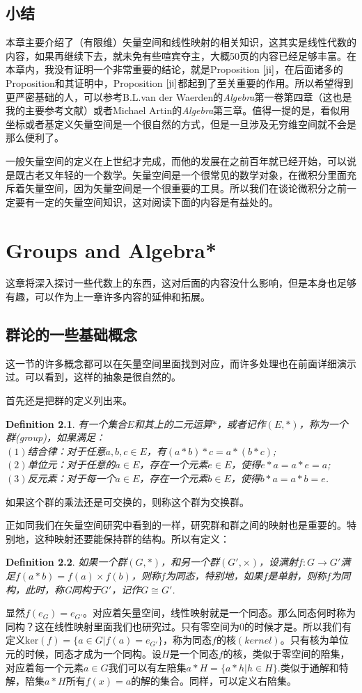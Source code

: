 \documentclass[11pt,a4paper,openany]{book}%
\theoremstyle{plain}%
\newtheorem{defi}{Definition}[chapter]%
\newcommand{\NO}[1]{{$(#1)$}}%
\newcommand{\pref}[1]{{\rm Proposition} $\ref{#1}$}
\begin{document}
\section{小结}
本章主要介绍了（有限维）矢量空间和线性映射的相关知识，这其实是线性代数的内容，如果再继续下去，就未免有些喧宾夺主，大概50页的内容已经足够丰富。在本章内，我没有证明一个非常重要的结论，就是\pref{ji}，在后面诸多的Proposition和其证明中，\pref{ji}都起到了至关重要的作用。所以希望得到更严密基础的人，可以参考B.L.van der Waerden的\textit{Algebra}第一卷第四章（这也是我的主要参考文献）或者Michael Artin的\textit{Algebra}第三章。值得一提的是，看似用坐标或者基定义矢量空间是一个很自然的方式，但是一旦涉及无穷维空间就不会是那么便利了。

一般矢量空间的定义在上世纪才完成，而他的发展在之前百年就已经开始，可以说是既古老又年轻的一个数学。矢量空间是一个很常见的数学对象，在微积分里面充斥着矢量空间，因为矢量空间是一个很重要的工具。所以我们在谈论微积分之前一定要有一定的矢量空间知识，这对阅读下面的内容是有益处的。
\chapter{Groups and Algebra*}
这章将深入探讨一些代数上的东西，这对后面的内容没什么影响，但是本身也足够有趣，可以作为上一章许多内容的延伸和拓展。
\section{群论的一些基础概念}
这一节的许多概念都可以在矢量空间里面找到对应，而许多处理也在前面详细演示过。可以看到，这样的抽象是很自然的。

首先还是把群的定义列出来。
\begin{defi}有一个集合$E$和其上的二元运算$*$，或者记作$(E,*)$，称为一个群\rm{(group)}，如果满足：\\
\NO{1}结合律：对于任意$a,b,c\in E$，有$(a*b)*c=a*(b*c)$;\\
\NO{2}单位元：对于任意的$a\in E$，存在一个元素$e\in E$，使得$e*a=a*e=a$;\\
\NO{3}反元素：对于每一个$a\in E$，存在一个元素$b\in E$，使得$b*a=a*b=e$.
\end{defi}
如果这个群的乘法还是可交换的，则称这个群为交换群。

正如同我们在矢量空间研究中看到的一样，研究群和群之间的映射也是重要的。特别地，这种映射还要能保持群的结构。所以有定义：
\begin{defi}如果一个群$(G,*)$，和另一个群$(G',\times)$，设满射$f:G\rightarrow G'$满足$f(a*b)=f(a)\times f(b)$，则称$f$为同态，特别地，如果$f$是单射，则称$f$为同构，此时，称G同构于$G'$，记作$G \cong G'$.
\end{defi}
显然$f(e_G)=e_{G'}$。对应着矢量空间，线性映射就是一个同态。那么同态何时称为同构？这在线性映射里面我们也研究过。只有零空间为0的时候才是。所以我们有定义$\mathrm{ker}(f)=\{a\in G|f(a)=e_{G'}\}$，称为同态$f$的核$(kernel)$。只有核为单位元的时候，同态才成为一个同构。设$H$是一个同态$f$的核，类似于零空间的陪集，对应着每一个元素$a \in G$我们可以有左陪集$a*H=\{a*h|h \in H\}$.类似于通解和特解，陪集$a*H$所有$f(x)=a$的解的集合。同样，可以定义右陪集。
\end{document}
